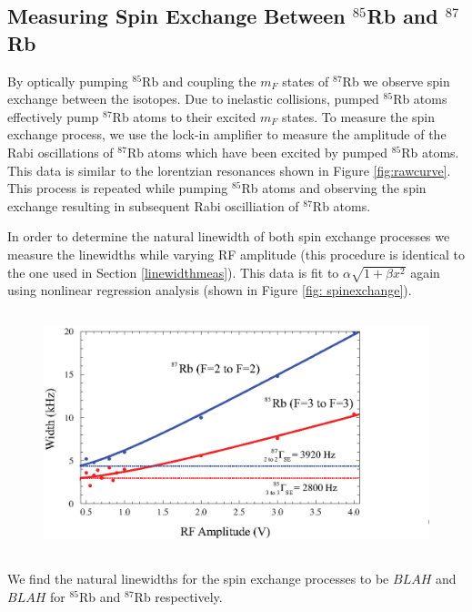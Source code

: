 \subsection{Measuring Spin Exchange Between $^{85}$Rb and $^{87}$Rb}
By optically pumping $^{85}$Rb and coupling the $m_F$ states of $^{87}$Rb we observe spin exchange between the isotopes. Due to inelastic collisions, pumped $^{85}$Rb atoms effectively pump $^{87}$Rb atoms to their excited $m_F$ states.  To measure the spin exchange process, we use the lock-in amplifier to measure the amplitude of the Rabi oscillations of $^{87}$Rb atoms which have been excited by pumped $^{85}$Rb atoms.  This data is similar to the lorentzian resonances shown in Figure \ref{fig:rawcurve}.  This process is repeated while pumping $^{85}$Rb atoms and observing the spin exchange resulting in subsequent Rabi oscilliation of $^{87}$Rb atoms.

In order to determine the natural linewidth of both spin exchange processes we measure the linewidths while varying RF amplitude (this procedure is identical to the one used in Section \ref{linewidthmeas}).  This data is fit to $\alpha \sqrt{1+\beta x^2}$ again using nonlinear regression analysis (shown in Figure \ref{fig: spinexchange}).
\begin{figure}[htbp]
\begin{center}
\includegraphics[height=70mm]{./figures/spin_exchange.eps}
\caption{\small{}}
\label{fig:spinexchange}
\end{center}
\end{figure}
We find the natural linewidths for the spin exchange processes to be $BLAH$ and $BLAH$ for $^{85}$Rb and $^{87}$Rb respectively.